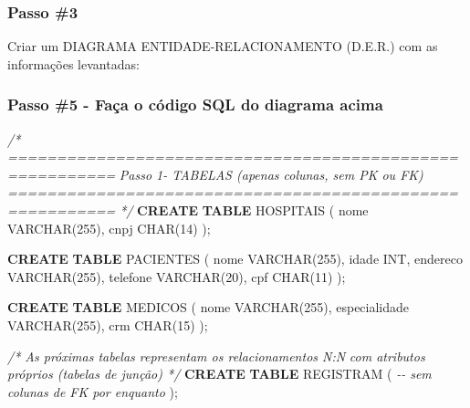 \documentclass[
]{book}
\newenvironment{Shaded}{\begin{snugshade}}{\end{snugshade}}
\newcommand{\CommentTok}[1]{\textcolor[rgb]{0.56,0.35,0.01}{\textit{#1}}}
\newcommand{\DataTypeTok}[1]{\textcolor[rgb]{0.13,0.29,0.53}{#1}}
\newcommand{\DecValTok}[1]{\textcolor[rgb]{0.00,0.00,0.81}{#1}}
\newcommand{\KeywordTok}[1]{\textcolor[rgb]{0.13,0.29,0.53}{\textbf{#1}}}
\newcommand{\NormalTok}[1]{#1}
\begin{document}
\subsubsection{Passo \#3}\label{passo-3-2}

Criar um DIAGRAMA ENTIDADE-RELACIONAMENTO (D.E.R.) com as informações levantadas:



\subsubsection{Passo \#5 - Faça o código SQL do diagrama acima}\label{passo-5---fauxe7a-o-cuxf3digo-sql-do-diagrama-acima}

\begin{Shaded}
\begin{Highlighting}[]

\CommentTok{/* =========================================================}
\CommentTok{   Passo 1{-} TABELAS (apenas colunas, sem PK ou FK)}
\CommentTok{   ========================================================= */}
\KeywordTok{CREATE} \KeywordTok{TABLE}\NormalTok{ HOSPITAIS }
\NormalTok{(}
\NormalTok{    nome    }\DataTypeTok{VARCHAR}\NormalTok{(}\DecValTok{255}\NormalTok{),}
\NormalTok{    cnpj    }\DataTypeTok{CHAR}\NormalTok{(}\DecValTok{14}\NormalTok{)}
\NormalTok{);}

\KeywordTok{CREATE} \KeywordTok{TABLE}\NormalTok{ PACIENTES }
\NormalTok{(}
\NormalTok{    nome        }\DataTypeTok{VARCHAR}\NormalTok{(}\DecValTok{255}\NormalTok{),}
\NormalTok{    idade       }\DataTypeTok{INT}\NormalTok{,}
\NormalTok{    endereco    }\DataTypeTok{VARCHAR}\NormalTok{(}\DecValTok{255}\NormalTok{),}
\NormalTok{    telefone    }\DataTypeTok{VARCHAR}\NormalTok{(}\DecValTok{20}\NormalTok{),}
\NormalTok{    cpf         }\DataTypeTok{CHAR}\NormalTok{(}\DecValTok{11}\NormalTok{)}
\NormalTok{);}

\KeywordTok{CREATE} \KeywordTok{TABLE}\NormalTok{ MEDICOS }
\NormalTok{(}
\NormalTok{    nome            }\DataTypeTok{VARCHAR}\NormalTok{(}\DecValTok{255}\NormalTok{),}
\NormalTok{    especialidade   }\DataTypeTok{VARCHAR}\NormalTok{(}\DecValTok{255}\NormalTok{),}
\NormalTok{    crm             }\DataTypeTok{CHAR}\NormalTok{(}\DecValTok{15}\NormalTok{)}
\NormalTok{);}

\CommentTok{/* As próximas tabelas representam os relacionamentos N:N}
\CommentTok{   com atributos próprios (tabelas de junção) */}
\KeywordTok{CREATE} \KeywordTok{TABLE}\NormalTok{ REGISTRAM }
\NormalTok{(}
    \CommentTok{{-}{-} sem colunas de FK por enquanto}
\NormalTok{);}


\end{Highlighting}
\end{Shaded}
\end{document}
